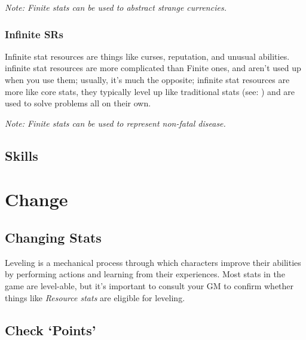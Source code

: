 \documentclass[../main.tex]{subfiles}
\begin{document}
        \emph{Note: Finite stats can be used to abstract strange currencies.}
        \begin{mdframed}[style=Arrata]
            {\em
                \lipsum[1]
            }
        \end{mdframed}

        \subsubsection{Infinite SRs}

        Infinite stat resources are things like curses, reputation, and unusual abilities. infinite stat resources are more complicated than Finite ones, and aren't used up when you use them; usually, it's much the opposite; infinite stat resources are more like core stats, they typically level up like traditional stats (see: {}) and are used to solve problems all on their own.

        \emph{Note: Finite stats can be used to represent non-fatal disease.}
        \begin{mdframed}[style=Arrata]
            {\em
                \lipsum[1]
            }
        \end{mdframed}

    \subsection{Skills}

    \section{Change}

    \subsection{Changing Stats}\label{changing stats}

    Leveling is a mechanical process through which characters improve their abilities by performing actions and learning from their experiences. Most stats in the game are level-able, but it's important to consult your GM to confirm whether things like \emph{Resource stats} are eligible for leveling.

    \subsection{Check `Points'}
\end{document}
